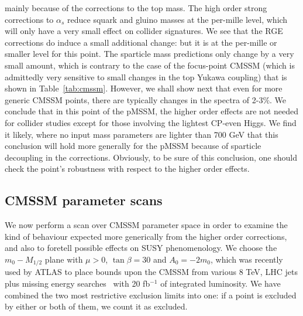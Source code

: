 \documentclass[final,3p,times,pdflatex]{elsarticle}
\begin{document}
mainly because of the  corrections to the top mass. The high order strong
corrections to $\alpha_s$ reduce
squark and gluino masses at the per-mille level, which will only have a very
small effect on collider signatures. 
We see that the RGE corrections do induce a small additional change: but it is
at the per-mille or smaller level for this point.
The sparticle mass predictions only change by a
very small amount, which is contrary to the case of the focus-point CMSSM
(which is 
admittedly very sensitive to small changes in the top Yukawa coupling) that is
shown in Table~\ref{tab:cmssm}. However, we shall show next that even for more
generic CMSSM points, there are typically changes in the spectra of 2-3$\%$.
We conclude that in this point of the pMSSM, the higher order effects are not
needed for collider studies except for those involving the lightest CP-even
Higgs. We find it likely, where no input mass parameters are lighter
than 700 GeV that this conclusion will hold more generally for the
pMSSM because of sparticle decoupling in the corrections. 
Obviously, to be sure of this conclusion, one should check the point's
robustness with respect to the higher order effects. 

\subsection{CMSSM parameter scans}

We now perform a scan over CMSSM parameter space in order to examine the kind
of behaviour expected more generically from the higher order corrections, and
also to foretell possible effects on SUSY phenomenology. We choose the
$m_0-M_{1/2}$ plane with $\mu>0$, $\tan \beta=30$ and $A_0=-2m_0$, which was
recently used by ATLAS to place bounds upon the CMSSM from various 8
TeV,  LHC jets plus missing energy
searches~\cite{ATLAS-CONF-2013-047,Aad:2013wta} with 20 fb$^{-1}$ of
integrated luminosity.  
We have combined the two most restrictive exclusion limits into one: if a
point is excluded by either or both of them, we count it as excluded. 
\end{document}
